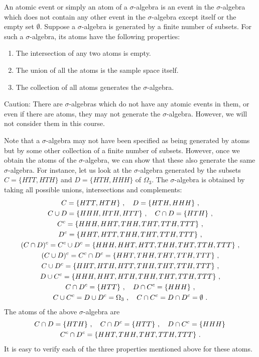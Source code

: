 \documentclass[12pt]{article} %
\begin{document}
An atomic event or simply an atom of a $\sigma$-algebra is an event in
the $\sigma$-algebra which does not contain any other event in the
$\sigma$-algebra except itself or the empty set $\emptyset$. Suppose a
$\sigma$-algebra is generated by a finite number of subsets. For such a
$\sigma$-algebra, its atoms have the following properties:
\begin{enumerate}
\item The intersection of any two atoms is empty.
\item The union of all the atoms is the sample space itself.
\item The collection of all atoms generates the $\sigma$-algebra.
\end{enumerate}
Caution: There are $\sigma$-algebras which do not have any atomic
events in them, or even if there are atoms, they may not generate the
$\sigma$-algebra. However, we will not consider them in this course.

Note that a $\sigma$-algebra may not have been specified as being
generated by atoms but by some other collection of a finite number of
subsets. However, once we obtain the atoms of the $\sigma$-algebra, we
can show that these also generate the same $\sigma$-algebra. For
instance, let us look at the $\sigma$-algebra generated by the subsets
$C = \{HTT, HTH\}$ and $D = \{HTH, HHH\}$ of $\Omega_3$. The
$\sigma$-algebra is obtained by taking all possible unions,
intersections and complements:
\begin{gather}
  C = \{HTT, HTH\}\ ,\quad D = \{HTH, HHH\}\ ,\notag\\
  C \cup D = \{HHH, HTH, HTT\}\ ,\quad C \cap D = \{HTH\}\ ,\notag\\
  C^c = \{HHH, HHT, THH, THT, TTH, TTT\}\ ,\notag\\
  D^c = \{HHT, HTT, THH, THT, TTH, TTT\}\ ,\notag\\
  (C \cap D)^c = C^c \cup D^c = \{HHH, HHT, HTT, THH, THT, TTH, TTT\}\ ,\notag\\
  (C \cup D)^c = C^c \cap D^c = \{HHT, THH, THT, TTH, TTT\}\ ,\notag\\
  C \cup D^c = \{HHT, HTH, HTT, THH, THT, TTH, TTT\}\ ,\notag\\
  D \cup C^c = \{HHH, HHT, HTH, THH, THT, TTH, TTT\}\ ,\notag\\
  C \cap D^c = \{HTT\}\ ,\quad D \cap C^c = \{HHH\}\ ,\notag\\
  C \cup C^c = D \cup D^c = \Omega_3\ ,\quad C \cap C^c = D \cap D^c = \emptyset\ .
\end{gather}
The atoms of the above $\sigma$-algebra are
\begin{gather}
  C \cap D = \{HTH\}\ ,\quad C \cap D^c = \{HTT\}\ ,\quad D \cap C^c = \{HHH\}\, \notag\\
  C^c \cap D^c = \{HHT, THH, THT, TTH, TTT\}\ .
\end{gather}
It is easy to verify each of the three properties mentioned above for
these atoms.
\end{document}
